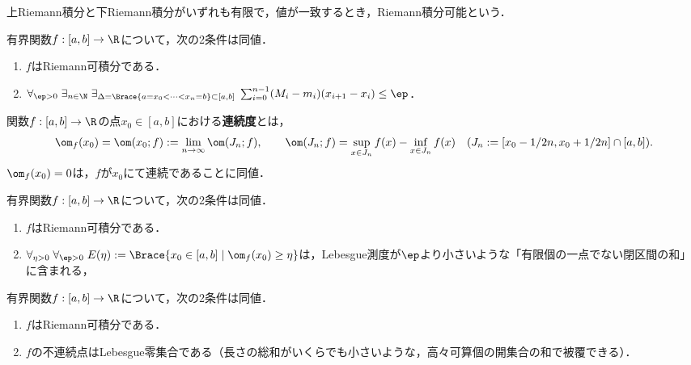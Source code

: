 \documentclass[uplatex, dvipdfmx]{jsreport}
\begin{document}
\begin{definition}
    上Riemann積分と下Riemann積分がいずれも有限で，値が一致するとき，Riemann積分可能という．
\end{definition}

\begin{corollary}[Darbouxの定理(1878)の系]
    有界関数$f:[a,b]\to\R$について，次の2条件は同値．
    \begin{enumerate}
        \item $f$はRiemann可積分である．
        \item $\forall_{\ep>0}\;\exists_{n\in\N}\;\exists_{\Delta=\Brace{a=x_0<\cdots<x_n=b}\subset[a,b]}\;\sum^{n-1}_{i=0}(M_i-m_i)(x_{i+1}-x_i)\le\ep$．
    \end{enumerate}
\end{corollary}

\begin{definition}[oscillation]
    関数$f:[a,b]\to\R$の点$x_0\in[a,b]$における\textbf{連続度}とは，
    \[\om_f(x_0)=\om(x_0;f):=\lim_{n\to\infty}\om(J_n;f),\qquad\om(J_n;f)=\sup_{x\in J_n}f(x)-\inf_{x\in J_n}f(x)\quad(J_n:=[x_0-1/2n,x_0+1/2n]\cap[a,b]).\]
    $\om_f(x_0)=0$は，$f$が$x_0$にて連続であることに同値．
\end{definition}

\begin{theorem}
    有界関数$f:[a,b]\to\R$について，次の2条件は同値．
    \begin{enumerate}
        \item $f$はRiemann可積分である．
        \item $\forall_{\eta>0}\;\forall_{\ep>0}\;E(\eta):=\Brace{x_0\in[a,b]\mid\om_f(x_0)\ge\eta}$は，Lebesgue測度が$\ep$より小さいような「有限個の一点でない閉区間の和」に含まれる，
    \end{enumerate}
\end{theorem}

\begin{theorem}[Lebesgue (1902)]
    有界関数$f:[a,b]\to\R$について，次の2条件は同値．
    \begin{enumerate}
        \item $f$はRiemann可積分である．
        \item $f$の不連続点はLebesgue零集合である（長さの総和がいくらでも小さいような，高々可算個の開集合の和で被覆できる）．
    \end{enumerate}
\end{theorem}
\end{document}
